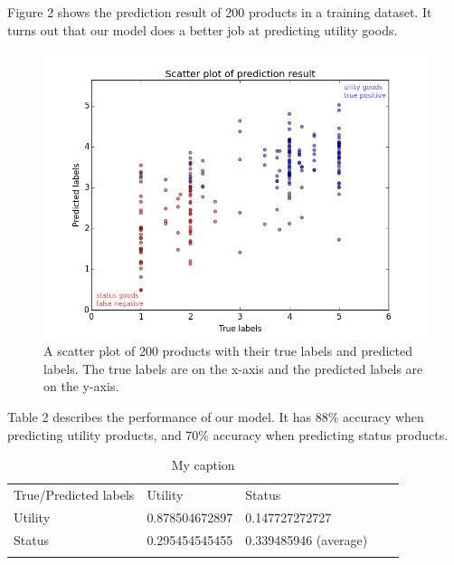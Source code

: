 \documentclass[dvips,12pt]{article}
\begin{document}
Figure 2 shows the prediction result of 200 products in a training dataset. It turns out that our model does a better job at predicting utility goods.

\begin{figure}[h] \label{scatterplot}
	\includegraphics[scale=0.6]{scatter}
	\centering
	\caption{A scatter plot of 200 products with their true labels and predicted labels. The true labels are on the x-axis and the predicted labels are on the y-axis.}
\end{figure}

Table 2 describes the performance of our model. It has 88\% accuracy when predicting utility products, and 70\% accuracy when predicting status products.

\begin{table}[] \label{fpr}
	\centering
	\caption{My caption}
	\label{my-label}
	\begin{tabular}{lllll}
		\cline{1-3}
		\multicolumn{1}{|l|}{True/Predicted labels} & \multicolumn{1}{l|}{Utility}        & \multicolumn{1}{l|}{Status}                &  &  \\ \cline{1-3}
		\multicolumn{1}{|l|}{Utility}               & \multicolumn{1}{l|}{0.878504672897} & \multicolumn{1}{l|}{0.147727272727}        &  &  \\ \cline{1-3}
		\multicolumn{1}{|l|}{Status}                & \multicolumn{1}{l|}{0.295454545455} & \multicolumn{1}{l|}{0.339485946 (average)} &  &  \\ \cline{1-3}
		&                                     &                                            &  & 
	\end{tabular}
\end{table}
\end{document}
